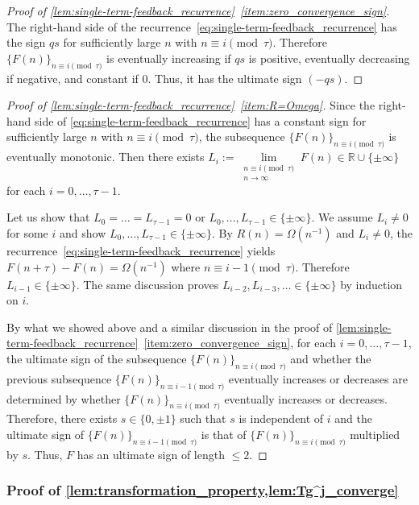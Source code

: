 \documentclass[a4paper,UKenglish,cleveref,autoref,thm-restate]{lipics-v2021}
\newcommand{\R}{\mathbb{R}}
\begin{document}
\begin{proof}[Proof of \cref{lem:single-term-feedback_recurrence}~\eqref{item:zero_convergence_sign}]
The right-hand side of the recurrence~\eqref{eq:single-term-feedback_recurrence} has the sign $qs$ for sufficiently large $n$ with $n \equiv i \pmod{\tau}$. Therefore $\{ F(n) \}_{n \equiv i \pmod{\tau}}$ is eventually increasing if $qs$ is positive, eventually decreasing if negative, and constant if $0$. Thus, it has the ultimate sign $(-qs)$. 
\end{proof}

\begin{proof}[Proof of \cref{lem:single-term-feedback_recurrence}~\eqref{item:R=Omega}]

Since the right-hand side of \cref{eq:single-term-feedback_recurrence} has a constant sign for sufficiently large $n$ with $n \equiv i \pmod{\tau}$, the subsequence $\{ F(n) \}_{n \equiv i \pmod{\tau}}$ is eventually monotonic. Then there exists $L_i := \lim\limits_{\substack{n \equiv i \pmod{\tau} \\ n \to \infty}} F(n) \in \R \cup \{ \pm \infty \}$ for each $i = 0, \dots, \tau-1$. 

Let us show that $L_0 = \dots = L_{\tau-1} = 0$ or $L_0, \dots, L_{\tau-1} \in \{ \pm \infty\}$. We assume $L_i \neq 0$ for some $i$ and show $L_0, \dots, L_{\tau-1} \in \{ \pm \infty\}$. By $R(n) = \Omega(n^{-1})$ and $L_i \neq 0$, the recurrence~\eqref{eq:single-term-feedback_recurrence} yields $F(n+\tau) - F(n) = \Omega(n^{-1})$ where $n \equiv i-1 \pmod{\tau}$. Therefore $L_{i-1} \in \{ \pm \infty \}$. The same discussion proves $L_{i-2}, L_{i-3}, \dots  \in \{ \pm \infty\}$ by induction on $i$. 


By what we showed above and a similar discussion in the proof of \cref{lem:single-term-feedback_recurrence}~\eqref{item:zero_convergence_sign}, for each $i=0, \dots, \tau-1$, the ultimate sign of the subsequence $\{ F(n) \}_{n \equiv i \pmod{\tau}}$ and whether the previous subsequence $\{ F(n) \}_{n \equiv i-1 \pmod{\tau}}$ eventually increases or decreases are determined by whether $\{ F(n) \}_{n \equiv i \pmod{\tau}}$ eventually increases or decreases. 
Therefore, there exists $s \in \{ 0, \pm 1 \}$ such that $s$ is independent of $i$ and the ultimate sign of $\{ F(n) \}_{n \equiv i-1 \pmod{\tau}}$ is that of $\{ F(n) \}_{n \equiv i \pmod{\tau}}$ multiplied by $s$. 
Thus, $F$ has an ultimate sign of length $\leq 2$. 
\end{proof}

\subsubsection*{Proof of \cref{lem:transformation_property,lem:Tg^j_converge}} 
\end{document}
